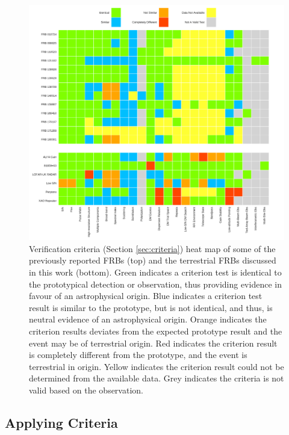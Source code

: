 \documentclass[a4paper,fleqn,usenatbib]{mnras}
\begin{document}
\begin{figure}
    \includegraphics[width=1.0\linewidth]{verification/FRBheatmap.pdf}
    \caption{Verification criteria (Section \ref{sec:criteria}) heat map of some
    of the previously reported FRBs (top) and the terrestrial FRBs discussed in
    this work (bottom).  Green indicates a criterion test is identical to the
    prototypical detection or observation, thus providing evidence in favour of
    an astrophysical origin.  Blue indicates a criterion test result is similar
    to the prototype, but is not identical, and thus, is neutral evidence of an
    astrophysical origin.  Orange indicates the criterion results deviates from
    the expected prototype result and the event may be of terrestrial origin.
    Red indicates the criterion result is completely different from the
    prototype, and the event is terrestrial in origin. Yellow indicates the
    criterion result could not be determined from the available data.  Grey
    indicates the criteria is not valid based on the observation.
    }
    \label{fig:heat_map}
\end{figure}


\subsection{Applying Criteria}
\end{document}
